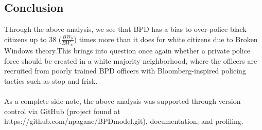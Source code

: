 \documentclass[10pt]{article}
\begin{document}
\subsection*{Conclusion}
 Through the above analysis, we see that BPD has a bias to over-police black citizens up to 38 ($\frac{BW_b}{BW_w}$) times more than it does for white citizens due to Broken Windows theory.This brings into question once again whether a private police force should be created in a white majority neighborhood, where the officers are recruited from poorly trained BPD officers with Bloomberg-inspired policing tactics such as stop and frisk. \\
 \\
 As a complete side-note, the above analysis was supported through version control via GitHub (project found at https://github.com/npagane/BPDmodel.git), documentation, and profiling.

 
\end{document}
